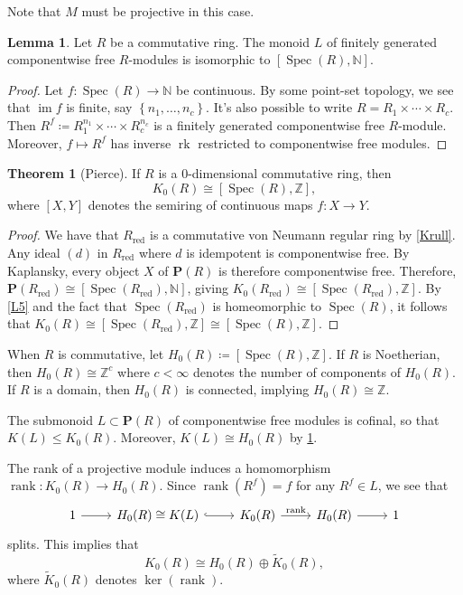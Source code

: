 \documentclass[10pt,letterpaper,cm]{nupset}
\theoremstyle{definition}
\theoremstyle{theorem}
\newtheorem{theorem}[definition]{Theorem}
\newtheorem{lemma}[definition]{Lemma}
\theoremstyle{remark}
\newcommand{\N}{\mathbb N}
\renewcommand{\P}{\mathbf P}
\newcommand{\Z}{\mathbb Z}
\newcommand{\1}{\mathbf{1}}
\newcommand{\0}{\vec 0}
\DeclareMathOperator{\im}{im}
\DeclareMathOperator{\red}{red}
\DeclareMathOperator{\spec}{Spec}
\DeclareMathOperator{\rank}{rank}
\DeclareMathOperator{\rk}{rk}
\begin{document}
Note that $M$ must be projective in this case.

\begin{lemma}\label{L6}
Let $R$ be a commutative ring. The monoid $L$ of finitely generated componentwise free $R$-modules is isomorphic to $\left[\spec(R), \N\right]$.
\end{lemma}
\begin{proof}
Let $f: \spec(R) \to \N$ be continuous. By some point-set topology, we see that $\im f$ is finite, say $\left\{n_1, \ldots, n_c\right\}$. It's also possible to write $R= R_1 \times \cdots \times R_c$. Then $R^f \coloneqq R_1^{n_1} \times \cdots \times R_c^{n_c}$ is a finitely generated componentwise free $R$-module. Moreover, $f \mapsto R^f$ has inverse $\rk$ restricted to componentwise free modules.
\end{proof}


\begin{theorem}[Pierce]
If $R$ is a $0$-dimensional commutative ring, then $$K_0(R) \cong \left[\spec(R), \Z\right],$$ where $[X, Y]$ denotes the semiring of continuous maps $f: X\to Y$.
\end{theorem}
\begin{proof}
We have that $R_{\red}$ is a commutative von Neumann regular ring by \cref{Krull}. Any ideal $(d)$ in $R_{\red}$  where $d$ is idempotent is componentwise free. By Kaplansky, every object $X$ of $\P(R)$ is therefore componentwise free. Therefore, $\P(R_{\red}) \cong \left[\spec(R_{\red}), \N\right]$, giving $K_0(R_{\red}) \cong [\spec(R_{\red}), \Z]$. By \cref{L5} and the fact that $\spec(R_{\red})$ is homeomorphic to $\spec(R)$, it follows that $K_0(R)\cong \left[\spec(R_{\red}), \Z\right] \cong \left[\spec(R), \Z\right]$.
\end{proof}

\smallskip

When $R$ is commutative, let $H_0(R) \coloneqq [\spec(R), \Z]$. If $R$ is Noetherian, then $H_0(R) \cong \Z^c$ where $c <\infty$ denotes the number of components of $H_0(R)$. If $R$ is a domain, then $H_0(R)$ is connected, implying $H_0(R) \cong \Z$.

The submonoid $L\subset \P(R)$ of componentwise free modules is cofinal, so that $K(L) \leq K_0(R)$. Moreover, $K(L) \cong H_0(R)$ by \cref{L6}.

The rank of a projective module induces a homomorphism $\rank: K_0(R) \to H_0(R)$. Since $\rank(R^f) = f$ for any $R^f \in L$, we see that
\[
\begin{tikzcd}
1 \arrow[r] & H_0(R) \cong K(L) \arrow[r, hook] & K_0(R) \arrow[r, "\rank"] & H_0(R) \arrow[r] & 1
\end{tikzcd}
\]
splits. This implies that $$K_0(R) \cong H_0(R) \oplus \widetilde{K}_0(R),$$ where $\widetilde{K}_0(R)$ denotes $\ker(\rank)$.
\end{document}
